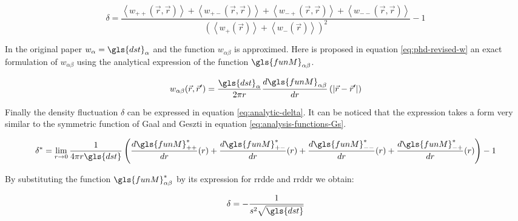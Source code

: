 \bigskip

\begin{equation}
  \delta = \frac{
  \left\langle w_{++} \left( \vec{r}, \vec{r} \right) \right\rangle +
  \left\langle w_{+-} \left( \vec{r}, \vec{r} \right) \right\rangle +
  \left\langle w_{-+} \left( \vec{r}, \vec{r} \right) \right\rangle +
  \left\langle w_{--} \left( \vec{r}, \vec{r} \right) \right\rangle
  }{
  \left(
  \left\langle w_{+} \left( \vec{r} \right) \right\rangle +
  \left\langle w_{-} \left( \vec{r} \right) \right\rangle
  \right)^2
  } - 1
  \label{eq:phd-fluctuation}
\end{equation}

\bigskip

In the original paper \( w_{\alpha} = \gls{dst}_{\alpha} \) and the function \( w_{\alpha \beta} \) is approximed.
Here is proposed in equation \eqref{eq:phd-revised-w} an exact formulation of \( w_{\alpha \beta} \) using the analytical expression of the function \( \gls{funM}_{\alpha \beta} \).

\begin{equation}
  w_{\alpha \beta} (\vec{r}, \vec{r}') = \frac{\gls{dst}_\alpha}{2 \pi r} \frac{d\gls{funM}_{\alpha \beta}}{dr}\left( \left| \vec{r}- \vec{r}' \right| \right)
  \label{eq:phd-revised-w}
\end{equation}

\bigskip

Finally the density fluctuation \( \delta \) can be expressed in equation \eqref{eq:analytic-delta}.
It can be noticed that the expression takes a form very similar to the symmetric function of Gaal and Geszti in equation \eqref{eq:analysis-functions-Gs}.

\bigskip

\begin{equation}
  \delta^* = \lim_{r \rightarrow 0}
  \frac{1}{4 \pi r \gls{dst}}
  \left(
  \frac{d\gls{funM}^*_{++}}{dr}(r) +
  \frac{d\gls{funM}^*_{+-}}{dr}(r) +
  \frac{d\gls{funM}^*_{--}}{dr}(r) +
  \frac{d\gls{funM}^*_{-+}}{dr}(r)
  \right) - 1
  \label{eq:analytic-delta}
\end{equation}

\bigskip

By substituting the function \( \gls{funM}^*_{\alpha \beta} \) by its expression for \gls{rrdde} and \gls{rrddr} we obtain:

\bigskip

\begin{equation}
  \delta = - \frac{1}{s^2 \sqrt{\gls{dst}}}
\end{equation}

